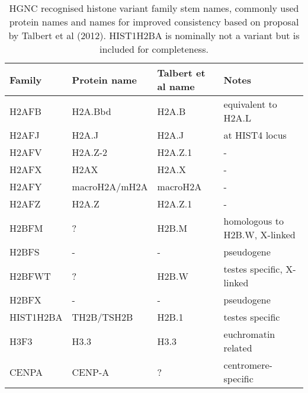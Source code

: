   \begin{table*}
    \caption{HGNC recognised histone variant family stem names, commonly used protein names 
	and names for improved consistency based on proposal by Talbert et al (2012). 
	HIST1H2BA is nominally not a variant but is included for completeness.}
    \label{tab:histone-variant-families}
    \centering
    \begin{tabular}{l l l l}
      \toprule
      Family & Protein name & Talbert et al name & Notes \\
      \midrule
	  H2AFB & H2A.Bbd & H2A.B & equivalent to H2A.L \\
	  H2AFJ & H2A.J & H2A.J & at HIST4 locus \\
	  H2AFV & H2A.Z-2 & H2A.Z.1 & - \\
	  H2AFX & H2AX & H2A.X & - \\
	  H2AFY & macroH2A/mH2A & macroH2A & - \\
	  H2AFZ & H2A.Z & H2A.Z.1 & - \\
	  H2BFM & ? & H2B.M & homologous to H2B.W, X-linked\\
	  H2BFS & - & - & pseudogene \\
	  H2BFWT & ? & H2B.W & testes specific, X-linked \\
	  H2BFX & - & - & pseudogene \\
	  HIST1H2BA & TH2B/TSH2B & H2B.1 & testes specific \\
	  H3F3 & H3.3 & H3.3 & euchromatin related \\
	  CENPA & CENP-A & ? & centromere-specific \\
	\bottomrule
    \end{tabular}
  \end{table*}

